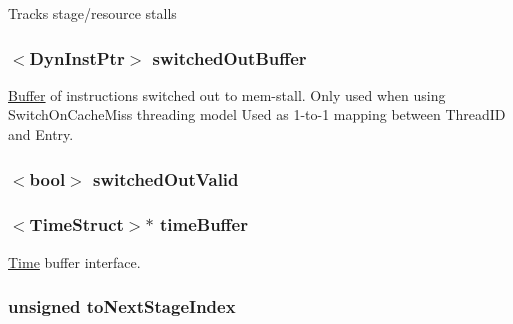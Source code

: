 Tracks stage/resource stalls \hypertarget{classPipelineStage_a693e4a546dfc51b4e402fe75e73e812e}{
\subsubsection[{switchedOutBuffer}]{$<${\bf DynInstPtr}$>$ {\bf switchedOutBuffer}}}
\label{classPipelineStage_a693e4a546dfc51b4e402fe75e73e812e}
\hyperlink{classBuffer}{Buffer} of instructions switched out to mem-\/stall. Only used when using SwitchOnCacheMiss threading model Used as 1-\/to-\/1 mapping between ThreadID and Entry. \hypertarget{classPipelineStage_a09a91d6926260c8037374f0b646a62ee}{
\subsubsection[{switchedOutValid}]{$<$bool$>$ {\bf switchedOutValid}}}
\label{classPipelineStage_a09a91d6926260c8037374f0b646a62ee}
\hypertarget{classPipelineStage_a83f9ee976e732665aeb08dbc19acfd45}{
\subsubsection[{timeBuffer}]{$<${\bf TimeStruct}$>$$\ast$ {\bf timeBuffer}}}
\label{classPipelineStage_a83f9ee976e732665aeb08dbc19acfd45}
\hyperlink{classTime}{Time} buffer interface. \hypertarget{classPipelineStage_ab6a826f43ca871b277e724aa148d1816}{
\subsubsection[{toNextStageIndex}]{\setlength{\rightskip}{0pt plus 5cm}unsigned {\bf toNextStageIndex}}}
